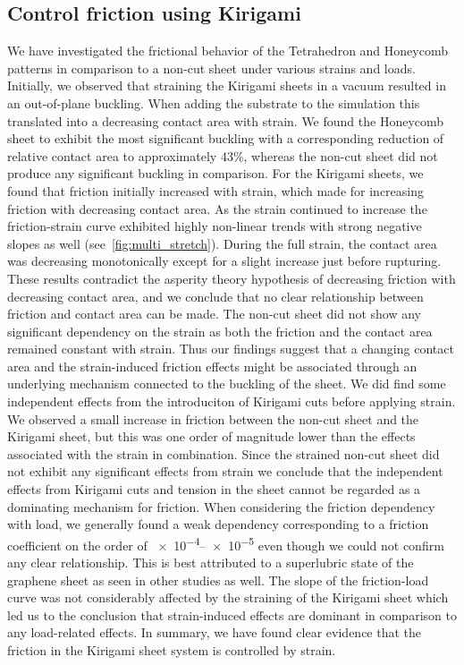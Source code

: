 \subsection{Control friction using Kirigami}
We have investigated the frictional behavior of the Tetrahedron and Honeycomb
patterns in comparison to a non-cut sheet under various strains and loads.
Initially, we observed that straining the Kirigami sheets in a vacuum resulted
in an out-of-plane buckling. When adding the substrate to the simulation this
translated into a decreasing contact area with strain. We found the Honeycomb
sheet to exhibit the most significant buckling with a corresponding reduction of
relative contact area to approximately 43\%, whereas the non-cut sheet did not
produce any significant buckling in comparison. For the Kirigami sheets, we
found that friction initially increased with strain, which made for increasing
friction with decreasing contact area. As the strain continued to increase the
friction-strain curve exhibited highly non-linear trends with strong negative
slopes as well (see~\cref{fig:multi_stretch}). During the full strain, the
contact area was decreasing monotonically except for a slight increase just
before rupturing. These results contradict the asperity theory hypothesis of
decreasing friction with decreasing contact area, and we conclude that no clear
relationship between friction and contact area can be made. The non-cut sheet
did not show any significant dependency on the strain as both the friction and
the contact area remained constant with strain. Thus our findings suggest that a
changing contact area and the strain-induced friction effects might be
associated through an underlying mechanism connected to the buckling of the
sheet. We did find some independent effects from the introduciton of Kirigami
cuts before applying strain. We observed a small increase in friction between
the non-cut sheet and the Kirigami sheet, but this was one order of magnitude
lower than the effects associated with the strain in combination. Since the
strained non-cut sheet did not exhibit any significant effects from strain we
conclude that the independent effects from Kirigami cuts and tension in the
sheet cannot be regarded as a dominating mechanism for friction. When
considering the friction dependency with load, we generally found a weak
dependency corresponding to a friction coefficient on the order of
\num{e-4}--\num{e-5} even though we could not confirm any clear relationship.
This is best attributed to a superlubric state of the graphene sheet as seen in
other studies as well. The slope of the friction-load curve was not considerably
affected by the straining of the Kirigami sheet which led us to the conclusion
that strain-induced effects are dominant in comparison to any load-related
effects. In summary, we have found clear evidence that the friction in the
Kirigami sheet system is controlled by strain. 

